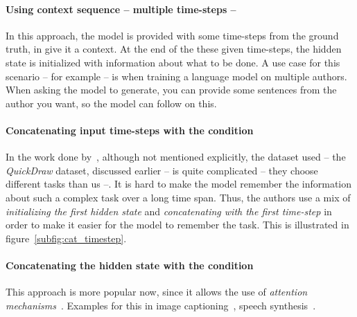 \paragraph{Using context sequence -- multiple time-steps --} In this approach, the model is provided with some time-steps from the ground truth, in give it a context. At the end of the these given time-steps, the hidden state is initialized with information about what to be done. A use case for this scenario -- for example -- is when training a language model on multiple authors. When asking the model to generate, you can provide some sentences from the author you want, so the model can follow on this.

\paragraph{Concatenating input time-steps with the condition} In the work done by~\citep{ha2017neural}, although not mentioned explicitly, the dataset used -- the \textit{QuickDraw} dataset, discussed earlier -- is quite complicated -- they choose different tasks than us --. It is hard to make the model remember the information about such a complex task over a long time span. Thus, the authors use a mix of \textit{initializing the first hidden state} and \textit{concatenating with the first time-step} in order to make it easier for the model to remember the task. This is illustrated in figure~\ref{subfig:cat_timestep}.

\paragraph{Concatenating the hidden state with the condition} This approach is more popular now, since it allows the use of \textit{attention mechanisms}~\citep{NIPS2010_4089,denil2012learning}. Examples for this in image captioning~\citep{xu2015show}, speech synthesis~\citep{wang2017tacotron}.

